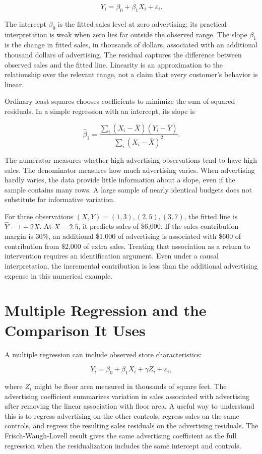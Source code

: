 \[
Y_i=\beta_0+\beta_1X_i+\varepsilon_i.
\]

The intercept \(\beta_0\) is the fitted sales level at zero advertising;
its practical interpretation is weak when zero lies far outside the
observed range. The slope \(\beta_1\) is the change in fitted sales, in
thousands of dollars, associated with an additional thousand dollars of
advertising. The residual captures the difference between observed sales
and the fitted line. Linearity is an approximation to the relationship
over the relevant range, not a claim that every customer's behavior is
linear.

Ordinary least squares chooses coefficients to minimize the sum of
squared residuals. In a simple regression with an intercept, its slope
is

\[
\hat\beta_1=\frac{\sum_i(X_i-\bar X)(Y_i-\bar Y)}{\sum_i(X_i-\bar X)^2}.
\]

The numerator measures whether high-advertising observations tend to
have high sales. The denominator measures how much advertising varies.
When advertising hardly varies, the data provide little information
about a slope, even if the sample contains many rows. A large sample of
nearly identical budgets does not substitute for informative variation.

For three observations \((X,Y)=(1,3),(2,5),(3,7)\), the fitted line is
\(\hat Y=1+2X\). At \(X=2.5\), it predicts sales of \$6,000. If the
sales contribution margin is 30\%, an additional \$1,000 of advertising
is associated with \$600 of contribution from \$2,000 of extra sales.
Treating that association as a return to intervention requires an
identification argument. Even under a causal interpretation, the
incremental contribution is less than the additional advertising expense
in this numerical example.

\hypertarget{M03-multiple-regression-and-the-comparison-it-uses}{%
\section{Multiple Regression and the Comparison It
Uses}\label{M03-multiple-regression-and-the-comparison-it-uses}}

\noindent A multiple regression can include observed store characteristics:

\[
Y_i=\beta_0+\beta_1X_i+\gamma Z_i+\varepsilon_i,
\]

where \(Z_i\) might be floor area measured in thousands of square feet.
The advertising coefficient summarizes variation in sales associated
with advertising after removing the linear association with floor area.
A useful way to understand this is to regress advertising on the other
controls, regress sales on the same controls, and regress the resulting
sales residuals on the advertising residuals. The Frisch-Waugh-Lovell
result gives the same advertising coefficient as the full regression
when the residualization includes the same intercept and controls.

